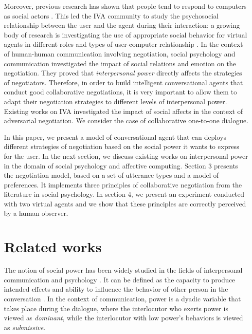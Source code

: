 \documentclass{llncs}
\begin{document}
	Moreover, previous research has shown that people tend to respond to computers as social actors \cite{bickmore2005establishing}. This led the IVA community to study the psychosocial relationship between the user and the agent during their interaction: a growing body of research is investigating the use of appropriate social behavior for virtual agents in different roles and types of user-computer relationship \cite{bickmore2005s,bickmore2005establishing,kidd2005sociable}. In the context of human-human communication involving negotiation, social psychology and communication \cite{dunbar2005perceptions,de1995impact} investigated the impact of social relations and emotion on the negotiation. They proved that  \emph{interpersonal power} directly affects the strategies of negotiators. Therefore, in order to build intelligent conversational agents that conduct good collaborative negotiations, it is very important to allow them to adapt their negotiation strategies to different levels of interpersonal power. Existing works on IVA \cite{traum2008multi, de2015humans, de2011effect}investigated the impact of social affects in the context of adversarial negotiation. We consider the case of collaborative one-to-one dialogue.
	
	In this paper, we present a model of conversational agent that can deploys different strategies of negotiation based on the social power it wants to express for the user. In the next section, we discuss existing works on interpersonal power in the domain of social psychology and affective computing. Section 3 presents the negotiation model, based on a set of utterance types and a model of preferences. It implements three principles of collaborative negotiation from the literature in social psychology. In section 4, we present an experiment conducted with two virtual agents and we show that these principles are correctly perceived by a human observer.	
	
	\section{Related works}
	The notion of social power has been widely studied in the fields of interpersonal communication and psychology \cite{kecskes2013research}. It can be defined as the capacity to produce intended effects and ability to influence the behavior of other person in the conversation \cite{dunbar2005perceptions}. In the context of communication, power is a dyadic variable that takes place during the dialogue, where the interlocutor who exerts power is viewed as \textit{dominant}, while the interlocutor with low power's behaviors is viewed as \textit{submissive}. 
\end{document}
